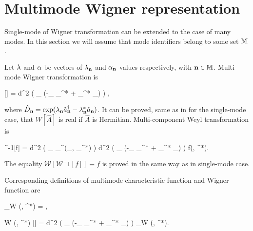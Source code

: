\section{Multimode Wigner representation}


Single-mode  of Wigner transformation can be extended to the case of many modes.
In this section we will assume that mode identifiers belong to some set $\mathbb{M}$ .

\begin{definition}
\label{def:wigner:mm:w-transformation}
	Let $\mathbf{\lambda}$ and $\mathbf{\alpha}$ be vectors of $\lambda_{\mathbf{n}}$ and $\alpha_{\mathbf{n}}$ values respectively,
	with $\mathbf{n} \in \mathbb{M}$.
	Multi-mode Wigner transformation is
	\begin{eqn*}
		[]
		= 
			\int d^2 \blambda
			\left(
				\prod_{\nvec \in \restbasis} \exp(-\lambda_{\nvec} \alpha_{\nvec}^* + \lambda_{\nvec}^* \alpha_{\nvec})
			\right)
			\Trace{
				\hat{A}
				\prod_{\nvec \in \restbasis} \hat{D}_{\nvec} (\lambda_{\nvec}, \lambda_{\nvec}^*)
			},
	\end{eqn*}
	where $\hat{D}_{\mathbf{n}} = \exp(\lambda_{\mathbf{n}} \hat{a}_{\mathbf{n}}^\dagger - \lambda_{\mathbf{n}}^* \hat{a}_{\mathbf{n}})$.
	It can be proved, same as in  for the single-mode case, that $W[\hat{A}]$ is real if $\hat{A}$ is Hermitian.
	Multi-component Weyl transformation is
	\begin{eqn*}
		^{-1}[f]
		=  \int d^2 \bxi
			\left( \prod_{\nvec \in \restbasis} _{\nvec}^{\dagger}(\xi_{\nvec}, \xi_{\nvec}^*) \right)
			\int d^2 \bfeta
				\left( \prod_{\nvec \in \restbasis}
					\exp(-\eta_{\nvec} \xi_{\nvec}^* + \eta_{\nvec}^* \xi_{\nvec})
				\right) f(\bfeta, \bfeta^*).
	\end{eqn*}
\end{definition}

The equality $\mathcal{W}[\mathcal{W}^-1[f]] \equiv f$ is proved in the same way as in single-mode case.

Corresponding definitions of multimode characteristic function and Wigner function are

\begin{definition}
\label{def:wigner:mm:w-definition}
	\begin{eqn*}
		\chi_W (\blambda, \blambda^*)
		= \Trace{
			\hat{\rho}
			\prod_{\nvec \in \restbasis} \hat{D}_{\nvec} (\lambda_{\nvec}, \lambda_{\nvec}^*)
		},
	\end{eqn*}
	\begin{eqn*}
		W (\balpha, \balpha^*)
		\equiv {}[\hat{\rho}]
		=  \int d^2 \blambda
			\left(
				\prod_{\nvec \in \restbasis}
				\exp(-\lambda_{\nvec} \alpha_{\nvec}^* + \lambda_{\nvec}^* \alpha_{\nvec})
			\right)
			\chi_W (\blambda, \blambda^*).
	\end{eqn*}
\end{definition}

